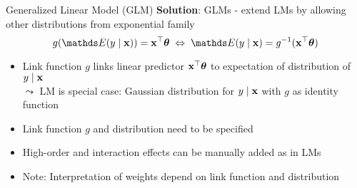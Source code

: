 \documentclass[11pt,compress,t,notes=noshow, aspectratio=169, xcolor=table]{beamer}
\begin{document}
\begin{frame}{Generalized Linear Model (GLM) }
\textbf{Solution}: GLMs - extend LMs by allowing other distributions from exponential family
$$g(\E (y \mid \xv)) = \xv^\top \thetav \; \Leftrightarrow \; \E (y \mid \xv) = g^{-1}(\xv^\top \thetav)$$
\vspace*{-0.5cm}
    \begin{itemize}
        \item Link function $g$ links linear predictor $\mathbf{x}^\top \bm{\theta}$ to expectation of distribution of $y \mid \mathbf{x}$\\ %
        $\leadsto$ LM is special case: Gaussian distribution for $y \mid \mathbf{x}$ with $g$ as identity function 
        \item Link function $g$ and distribution need to be specified 
        \item High-order and interaction effects can be manually added as in LMs
        \item Note: Interpretation of weights depend on link function and distribution
    \end{itemize}
\end{frame}
 	
\end{document}

